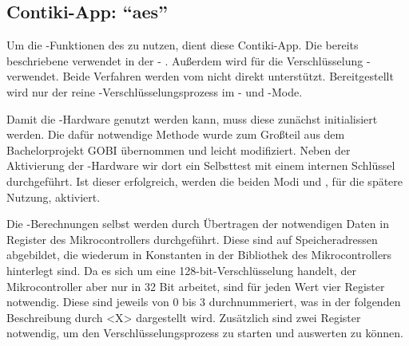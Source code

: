 \subsection{Contiki-App: "`aes"'}

Um die -Funktionen des  \cite{mc1322} zu nutzen, dient diese Contiki-App. Die bereits beschriebene 
verwendet in der  - \cite{rfc4493}. Außerdem wird für die Verschlüsselung - \cite{rfc3610} verwendet. Beide Verfahren
werden vom  nicht direkt unterstützt. Bereitgestellt wird nur der reine -Verschlüsselungsprozess im - und -Mode.

Damit die -Hardware genutzt werden kann, muss diese zunächst initialisiert werden. Die dafür notwendige Methode wurde zum Großteil aus dem Bachelorprojekt GOBI
übernommen und leicht modifiziert. Neben der Aktivierung der -Hardware wir dort ein Selbsttest mit einem internen Schlüssel durchgeführt. Ist dieser
erfolgreich, werden die beiden Modi  und , für die spätere Nutzung, aktiviert.

Die -Berechnungen selbst werden durch Übertragen der notwendigen Daten in Register des Mikrocontrollers durchgeführt. Diese sind auf Speicheradressen
abgebildet, die wiederum in Konstanten in der Bibliothek des Mikrocontrollers hinterlegt sind. Da es sich um eine 128-bit-Verschlüsselung handelt, der Mikrocontroller
aber nur in 32 Bit arbeitet, sind für jeden Wert vier Register notwendig. Diese sind jeweils von 0 bis 3 durchnummeriert, was in der folgenden Beschreibung durch <X>
dargestellt wird. Zusätzlich sind zwei Register notwendig, um den Verschlüsselungsprozess zu starten und auswerten zu können.

